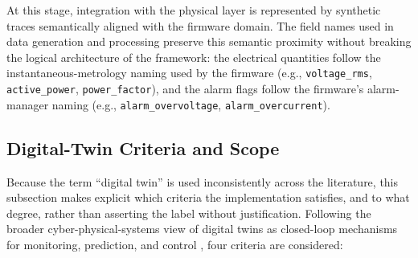 \documentclass{ieeeaccess}
\begin{document}
At this stage, integration with the physical layer is represented by synthetic traces semantically aligned with the firmware domain. The field names used in data generation and processing preserve this semantic proximity without breaking the logical architecture of the framework: the electrical quantities follow the instantaneous-metrology naming used by the firmware (e.g., \texttt{voltage\_rms}, \texttt{active\_power}, \texttt{power\_factor}), and the alarm flags follow the firmware's alarm-manager naming (e.g., \texttt{alarm\_overvoltage}, \texttt{alarm\_overcurrent}).

\subsection{Digital-Twin Criteria and Scope}
\label{subsec:twin_criteria}
Because the term ``digital twin'' is used inconsistently across the literature, this subsection makes explicit which criteria the implementation satisfies, and to what degree, rather than asserting the label without justification. Following the broader cyber-physical-systems view of digital twins as closed-loop mechanisms for monitoring, prediction, and control \cite{b15,b16,b24}, four criteria are considered:
\end{document}
